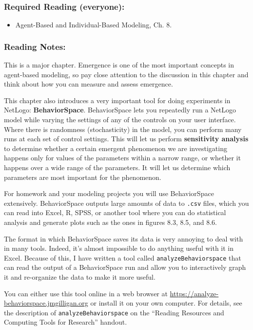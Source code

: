 \documentclass[
]{article}
\providecommand{\tightlist}{%
  \setlength{\itemsep}{0pt}\setlength{\parskip}{0pt}}
\begin{document}
\subsubsection{Required Reading
(everyone):}\label{required-reading-everyone-7}

\begin{itemize}
\tightlist
\item
  Agent-Based and Individual-Based Modeling, Ch. 8.
\end{itemize}

\subsubsection{Reading Notes:}\label{reading-notes-7}

This is a major chapter. Emergence is one of the most important concepts
in agent-based modeling, so pay close attention to the discussion in
this chapter and think about how you can measure and assess emergence.

This chapter also introduces a very important tool for doing experiments
in NetLogo: \textbf{BehaviorSpace}. BehaviorSpace lets you repeatedly
run a NetLogo model while varying the settings of any of the controls on
your user interface. Where there is randomness (stochasticity) in the
model, you can perform many runs at each set of control settings. This
will let us perform \textbf{sensitivity analysis} to determine whether a
certain emergent phenomenon we are investigating happens only for values
of the parameters within a narrow range, or whether it happens over a
wide range of the parameters. It will let us determine which parameters
are most important for the phenomenon.

For homework and your modeling projects you will use BehaviorSpace
extensively. BehaviorSpace outputs large amounts of data to
\texttt{.csv} files, which you can read into Excel, R, SPSS, or another
tool where you can do statistical analysis and generate plots such as
the ones in figures 8.3, 8.5, and 8.6.

The format in which BehaviorSpace saves its data is very annoying to
deal with in many tools. Indeed, it's almost impossible to do anything
useful with it in Excel. Because of this, I have written a tool called
\texttt{analyzeBehaviorspace} that can read the output of a
BehaviorSpace run and allow you to interactively graph it and
re-organize the data to make it more useful.

You can either use this tool online in a web browser at
\url{https://analyze-behaviorspace.jmgilligan.org} or install it on your
own computer. For details, see the description of
\texttt{analyzeBehaviorspace} on the ``Reading Resources and Computing
Tools for Research'' handout.
\end{document}
